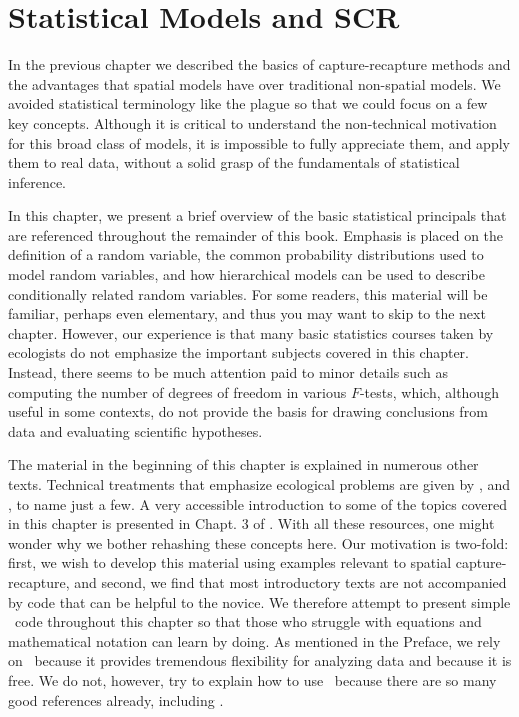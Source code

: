 \chapter{
Statistical Models and SCR
}
\label{chapt.modeling}


\vspace{.3in}

In the previous chapter we described the basics of capture-recapture
methods and the advantages that spatial models have over
traditional non-spatial models. We avoided statistical
terminology like the plague so that we could focus on a few key
concepts. Although it is critical to
understand the non-technical motivation for this broad class of
models, it is impossible to fully appreciate them, and apply them to
real data, without a solid grasp of the fundamentals of statistical
inference.

In this chapter, we present a brief overview of the basic
statistical principals that are referenced throughout the remainder of
this book. Emphasis is placed on the definition of a random variable,
the common probability distributions used to model random variables,
and how hierarchical models can be used to describe conditionally
related random variables. For some readers, this material will be
familiar, perhaps even elementary, and thus you may want to skip to the next
chapter. However, our experience is that many basic statistics courses
taken by ecologists do not emphasize the important subjects covered in
this chapter. Instead, there seems to be much attention paid to minor details
such as computing the number of degrees of freedom in
various $F$-tests, which, although useful in some contexts, do not
provide the basis for drawing conclusions from data and evaluating
scientific hypotheses.

The material in the beginning of this chapter is explained in numerous
other texts. Technical treatments that emphasize ecological problems
are given by \citet{williams_etal:2002}, \citet{royle_dorazio:2008} and
\citet{link_barker:2010}, to name just a few. A very accessible
introduction to some of the topics covered in this chapter is
presented in Chapt. 3 of \citet{mackenzie_etal:2006}. With all these
resources, one might wonder why we bother rehashing these concepts
here. Our motivation is two-fold: first, we wish to develop this
material using examples relevant to spatial capture-recapture, and
second, we find that most introductory texts are not accompanied by
code that can be helpful to the novice. We therefore attempt to
present simple \R~code throughout this chapter so that those who
struggle with equations and mathematical notation can learn by
doing. As mentioned in the Preface, we rely on \R~because it provides
tremendous flexibility for analyzing data and because it is free. We
do not, however, try to explain how to use \R~because there are so
many good references already, including
\citet{venables_ripley:2002,bolker:2008,venables_etal:2012}.

